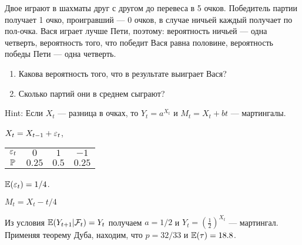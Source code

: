 \begin{problem}
Двое играют в шахматы друг с другом до перевеса в 5 очков. Победитель партии получает 1 очко, проигравший — 0 очков, в случае ничьей каждый получает по пол-очка. Вася играет лучше Пети, поэтому: вероятность ничьей — одна четверть, вероятность того, что победит Вася равна половине, вероятность победы Пети — одна четверть.
\begin{enumerate}
\item Какова вероятность того, что в результате выиграет Вася?
\item Сколько партий они в среднем сыграют?
\end{enumerate}


\begin{sol}

Hint:  Если $X_{t}$ — разница в очках, то $Y_t=a^{X_{t}}$ и $M_t=X_{t}+bt$ — мартингалы.

$X_t=X_{t-1}+\e_t$,

\begin{tabular}{cccc}
\toprule
$\e_t$ & $0$ & $1$ & $-1$ \\
$\P$ & $0.25$ & $0.5$ & $0.25$ \\
\bottomrule
\end{tabular}

$\E(\e_t)=1/4$.

$M_t=X_t-t/4$

Из условия $\E(Y_{t+1}|\cF_t)=Y_t$ получаем $a=1/2$ и $Y_t=\left( \frac{1}{2} \right)^{X_t}$ — мартингал. Применяя теорему Дуба, находим, что $p=32/33$ и $\E(\tau)=18.8$.


\end{sol}
\end{problem}


